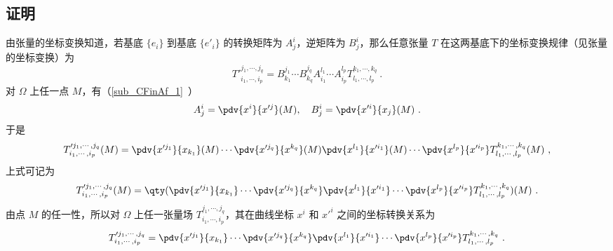 \subsection{证明}
由张量的坐标变换知道，若基底 $\{e_i\}$ 到基底 $\{e'_i\}$ 的转换矩阵为 $A^i_j$，逆矩阵为 $B^i_j$，那么任意张量 $T$ 在这两基底下的坐标变换规律（见张量的坐标变换）为
\begin{equation}
T'^{j_1,\cdots,j_q}_{i_1,\cdots,i_p}=B^{j_1}_{k_1}\cdots B^{j_q}_{k_q}A^{l_1}_{i_1}\cdots A^{l_p}_{i_p}T^{k_1,\cdots,k_q}_{l_1,\cdots,l_p}~.
\end{equation}
对 $\Omega$ 上任一点 $M$，有（\autoref{sub_CFinAf_1}~）
\begin{equation}
A^i_j=\pdv{x^i}{x'^j}(M),\quad B^i_j=\pdv{x'^i}{x_j}(M)~.
\end{equation}
于是
\begin{equation}
T'^{j_1,\cdots,j_q}_{i_1,\cdots,i_p}(M)=\pdv{x'^{j_1}}{x_{k_1}}(M)\cdots \pdv{x'^{j_q}}{x^{k_q}}(M)\pdv{x^{l_1}}{x'^{i_1}}(M)\cdots \pdv{x^{l_p}}{x'^{i_p}}T^{k_1,\cdots,k_q}_{l_1,\cdots,l_p}(M)~,
\end{equation}
上式可记为
\begin{equation}
T'^{j_1,\cdots,j_q}_{i_1,\cdots,i_p}(M)=\qty(\pdv{x'^{j_1}}{x_{k_1}}\cdots \pdv{x'^{j_q}}{x^{k_q}}\pdv{x^{l_1}}{x'^{i_1}}\cdots \pdv{x^{l_p}}{x'^{i_p}}T^{k_1,\cdots,k_q}_{l_1,\cdots,l_p})(M)~.
\end{equation}
由点 $M$ 的任一性，所以对 $\Omega$ 上任一张量场 $T^{j_1,\cdots,j_q}_{i_1,\cdots,i_p}$，其在曲线坐标 $x^i$ 和 $x'^i$ 之间的坐标转换关系为
\begin{equation}
T'^{j_1,\cdots,j_q}_{i_1,\cdots,i_p}=\pdv{x'^{j_1}}{x_{k_1}}\cdots \pdv{x'^{j_q}}{x^{k_q}}\pdv{x^{l_1}}{x'^{i_1}}\cdots \pdv{x^{l_p}}{x'^{i_p}}T^{k_1,\cdots,k_q}_{l_1,\cdots,l_p}~.
\end{equation}



